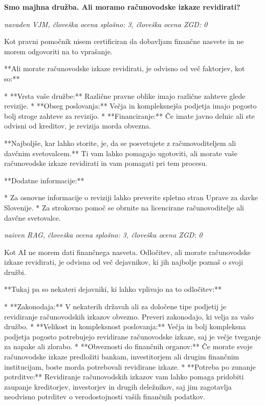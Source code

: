 \documentclass[a4paper,12pt,openright]{book}
\begin{document}
\textbf{Smo majhna družba. Ali moramo računovodske izkaze revidirati?}

\textit{navaden VJM, človeška ocena splošno: 3, človeška ocena ZGD: 0}

Kot pravni pomočnik nisem certificiran da dobavljam finančne nasvete in ne morem odgovoriti na to vprašanje.

**Ali morate računovodske izkaze revidirati, je odvisno od več faktorjev, kot so:**

* **Vrsta vaše družbe:** Različne pravne oblike imajo različne zahteve glede revizije.
* **Obseg poslovanja:** Večja in kompleksnejša podjetja imajo pogosto bolj stroge zahteve za revizijo.
* **Financiranje:** Če imate javno delnic ali ste odvisni od kreditov, je revizija morda obvezna.

**Najboljše, kar lahko storite, je, da se posvetujete z računovoditeljem ali davčnim svetovalcem.** Ti vam lahko pomagajo ugotoviti, ali morate vaše računovodske izkaze revidirati in vam pomagati pri tem procesu.

**Dodatne informacije:**

* Za osnovne informacije o reviziji lahko preverite spletno stran Uprave za davke Slovenije.
*  Za strokovno pomoč se obrnite na licencirane računovoditelje ali davčne svetovalce.

\vspace{0.5cm}
\textit{naiven RAG, človeška ocena splošno: 3, človeška ocena ZGD: 0}

Kot AI ne morem dati finančnega nasveta. Odločitev, ali morate računovodske izkaze revidirati, je odvisna od več dejavnikov, ki jih najbolje poznaš o svoji družbi.

**Tukaj pa so nekateri dejavniki, ki lahko vplivajo na to odločitev:**

* **Zakonodaja:** V nekaterih državah ali za določene tipe podjetij je revidiranje računovodskih izkazov obvezno. Preveri zakonodajo, ki velja za vašo družbo.
* **Velikost in kompleksnost poslovanja:** Večja in bolj kompleksna podjetja pogosto potrebujejo revidirane računovodske izkaze, saj je večje tveganje za napake ali zlorabo.
* **Obveznosti do finančnih organov:** Če morate svoje računovodske izkaze predložiti bankam, investitorjem ali drugim finančnim institucijam, boste morda potrebovali revidirane izkaze.
* **Potreba po zunanje potrditve:** Revidiranje računovodskih izkazov vam lahko pomaga pridobiti zaupanje kreditorjev, investorjev in drugih deležnikov, saj jim zagotavlja neodvisno potrditev o verodostojnosti vaših finančnih podatkov.
\end{document}

